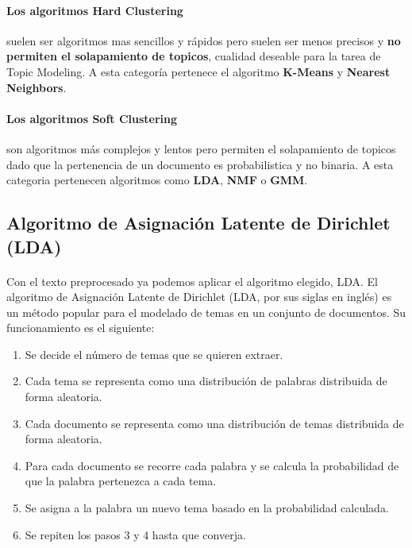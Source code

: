 \documentclass{report}
\begin{document}
{                \paragraph*{Los algoritmos Hard Clustering}{
                    suelen ser algoritmos mas sencillos y rápidos pero suelen ser menos precisos y \textbf{no permiten el solapamiento de topicos}, cualidad deseable para la tarea de Topic Modeling. A esta categoría pertenece el algoritmo \textbf{K-Means} y \textbf{Nearest Neighbors}.
                }
                \paragraph*{Los algoritmos Soft Clustering}{
                    son algoritmos más complejos y lentos pero permiten el solapamiento de topicos dado que la pertenencia de un documento es probabilistica y no binaria. A esta categoria pertenecen algoritmos como \textbf{LDA}, \textbf{NMF} o \textbf{GMM}.
                }
            \clearpage\subsection{Algoritmo de Asignación Latente de Dirichlet (LDA)}
                \paragraph*{}{
                    Con el texto preprocesado ya podemos aplicar el algoritmo elegido, LDA.
                    El algoritmo de Asignación Latente de Dirichlet (LDA, por sus siglas en inglés) es un método popular para el modelado de temas en un conjunto de documentos.
                    Su funcionamiento es el siguiente:
                }
                \begin{enumerate}
                    \item Se decide el número de temas que se quieren extraer.
                    \item Cada tema se representa como una distribución de palabras distribuida de forma aleatoria.
                    \item Cada documento se representa como una distribución de temas distribuida de forma aleatoria.
                    \item Para cada documento se recorre cada palabra y se calcula la probabilidad de que la palabra pertenezca a cada tema.
                    \item Se asigna a la palabra un nuevo tema basado en la probabilidad calculada.
                    \item Se repiten los pasos 3 y 4 hasta que converja.
                \end{enumerate}
}
\end{document}

